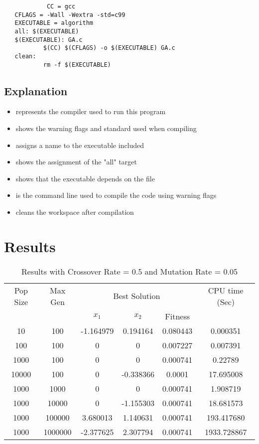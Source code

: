 \documentclass[12pt]{article}
\begin{document}
		\begin{lstlisting}
			CC = gcc
   CFLAGS = -Wall -Wextra -std=c99 
   EXECUTABLE = algorithm
   all: $(EXECUTABLE) 
   $(EXECUTABLE): GA.c
	       $(CC) $(CFLAGS) -o $(EXECUTABLE) GA.c 
   clean:
	       rm -f $(EXECUTABLE)
		\end{lstlisting}

    \subsection{Explanation}
        \begin{itemize}
		\item {} represents the compiler used to run this program
		\item {} shows the warning flags and standard used when compiling
		\item {} assigns a name to the executable included 
        \item {} shows the assignment of the "all" target
        \item {} shows that the executable depends on the  file
        \item {} is the command line used to compile the code using warning flags
        \item {} cleans the workspace after compilation
	\end{itemize}

	\section{Results}
	 
	\begin{table}[h!]
		\caption{Results with Crossover Rate = 0.5 and Mutation Rate = 0.05}
		\label{table:1}
		\centering
		\begin{tabular}{c c c c c c}
			\hline
			Pop Size & Max Gen & \multicolumn{3}{c}{Best Solution} & CPU time (Sec) \\
			& & $x_1$ & $x_2$ & Fitness & \\
			\hline
			10  & 100    & -1.164979  & 0.194164 & 0.080443 & 0.000351\\
			100 & 100    & 0 & 0 & 0.007227 & 0.007391 \\
			1000& 100    & 0 & 0 & 0.000741 & 0.22789\\
			10000& 100    & 0 & -0.338366  & 0.0001 & 17.695008\\
			\hline
			1000  & 1000   & 0 & 0 & 0.000741 & 1.908719\\
			1000 & 10000  & 0 & -1.155303 & 0.000741 & 18.681573\\
			1000& 100000 & 3.680013 & 1.140631  & 0.000741 & 193.417680\\
			1000& 1000000 & -2.377625 & 2.307794  & 0.000741 & 1933.728867\\
			\hline
		\end{tabular}
	\end{table}
\end{document}
